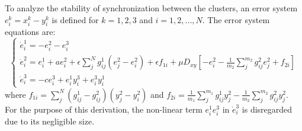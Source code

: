\documentclass[10pt]{article}
\begin{document}
To analyze the stability of synchronization between the clusters, an error system $e_i^k = x_i^k - y_i^k$ is defined for $k=1,2,3$ and $i=1,2,...,N$. The error system equations are:
$$
\left\{ \begin{array}{l}
\dot e_i^1 =  - e_i^2 - e_i^3\\
\dot e_i^2 = e_i^1 + ae_i^2 + \epsilon \sum\limits_j^N {{g_{ij}^1\left( {e_j^2 - e_i^2} \right) }} + \epsilon {f_{1i}} + \mu {D_{xy}}\left[ { - e_i^2 - \frac{1}{{{m_2}}}\sum\limits_j^{{m_2}} {g _{ij}^2e_j^2}  + {f_{2i}}} \right]\\
\dot e_i^3 =  - ce_i^3 + e_i^1y_i^3 + e_i^3y_i^1
\end{array} \right.
$$
where ${f_{1i}} = \sum\limits_j^{{N}} {\left( {g_{ij}^1 - g_{ij}^2} \right)\left( {y_j^2 - y_i^2} \right)}$ and ${f_{2i}} = \frac{1}{{{m_1}}}\sum\limits_j^{{m_1}} {g _{ij}^1y_j^2}  - \frac{1}{{{m_2}}}\sum\limits_j^{{m_2}} {g _{ij}^2y_j^2}$. For the purpose of this derivation, the non-linear term ${e^1_i}{e^3_i}$ in $\dot e_i^3$ is disregarded due to its negligible size.
\end{document}
